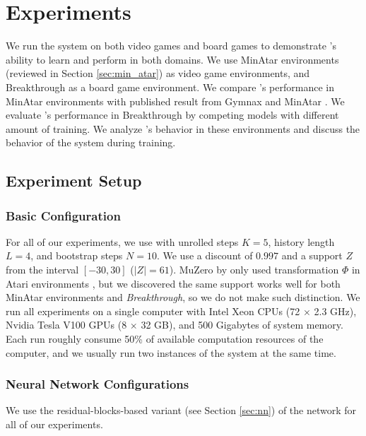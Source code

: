 \chapter{Experiments}
\label{sec:exp}
We run the \moozi system on both video games and board games to demonstrate \moozi's ability to learn and perform in both domains.
We use MinAtar environments (reviewed in Section \ref{sec:min_atar}) as video game environments, and Breakthrough as a board game environment.
We compare \moozi's performance in MinAtar environments with published result from Gymnax \cite{GymnaxJAXbasedReinforcement_RobertTjarkoLange_2022} and MinAtar \cite{MinAtarAtariInspiredTestbed_Young.Tian_2019}.
We evaluate \moozi's performance in Breakthrough by competing \moozi models with different amount of training.
We analyze \moozi's behavior in these environments and discuss the behavior of the system during training.

\section{Experiment Setup}
\subsection{Basic Configuration}
For all of our experiments, we use \moozi with unrolled steps $K = 5$, history length $L = 4$, and bootstrap steps $N = 10$.
We use a discount of $0.997$ and a support $Z$ from the interval  $[-30, 30]$ ($|Z| = 61$).
MuZero by \citeauthor{MasteringAtariGo_Schrittwieser.Antonoglou.ea_2020} only used transformation $\Phi$ in Atari environments \cite{MasteringAtariGo_Schrittwieser.Antonoglou.ea_2020}, but we discovered the same support works well for both MinAtar environments and \textit{Breakthrough}, so we do not make such distinction.
We run all experiments on a single computer with Intel Xeon CPUs (72 $\times$ 2.3 GHz), Nvidia Tesla V100 GPUs (8 $\times$ 32 GB), and 500 Gigabytes of system memory.
Each run roughly consume 50\% of available computation resources of the computer, and we usually run two instances of the system at the same time.

\subsection{Neural Network Configurations}
We use the residual-blocks-based variant (see Section \ref{sec:nn}) of the network for all of our experiments.

